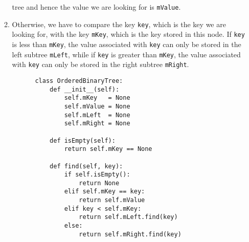 \begin{enumerate}
\begin{enumerate}
            tree and hence the value we are looking for is \texttt{mValue}.
      \item Otherwise, we have to compare the key \texttt{key}, which is the key we are looking for,
            with the key \texttt{mKey}, which is the key stored in this node.  If \texttt{key}
            is less than \texttt{mKey}, the value associated with \texttt{key} can only be stored in the left subtree
            \texttt{mLeft}, while if \texttt{key} is greater than \texttt{mKey}, the value associated with
            \texttt{key} can only be stored in the right subtree \texttt{mRight}.
      \end{enumerate}


\begin{figure}[!ht]
  \centering
\begin{verbatim}
    class OrderedBinaryTree:
        def __init__(self):
            self.mKey   = None
            self.mValue = None
            self.mLeft  = None
            self.mRight = None
    
        def isEmpty(self):
            return self.mKey == None
    
        def find(self, key):
            if self.isEmpty():
                return None
            elif self.mKey == key:
                return self.mValue
            elif key < self.mKey:
                return self.mLeft.find(key)
            else:
                return self.mRight.find(key)
    

\end{verbatim}
\end{figure}
\end{enumerate}
